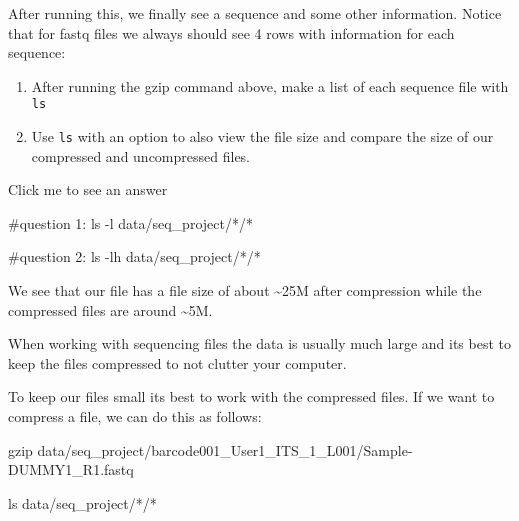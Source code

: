 \documentclass[
  letterpaper,
  DIV=11,
  numbers=noendperiod]{scrreprt}
\newenvironment{Shaded}{}{}
\newcommand{\AttributeTok}[1]{\textcolor[rgb]{0.84,0.23,0.29}{#1}}
\newcommand{\CommentTok}[1]{\textcolor[rgb]{0.42,0.45,0.49}{#1}}
\newcommand{\FunctionTok}[1]{\textcolor[rgb]{0.44,0.26,0.76}{#1}}
\newcommand{\NormalTok}[1]{\textcolor[rgb]{0.14,0.16,0.18}{#1}}
\newcommand{\PreprocessorTok}[1]{\textcolor[rgb]{0.84,0.23,0.29}{#1}}
\providecommand{\tightlist}{%
  \setlength{\itemsep}{0pt}\setlength{\parskip}{0pt}}\usepackage{longtable,booktabs,array}
\begin{document}
After running this, we finally see a sequence and some other
information. Notice that for fastq files we always should see 4 rows
with information for each sequence:

\begin{tcolorbox}[enhanced jigsaw, bottomtitle=1mm, colframe=quarto-callout-caution-color-frame, left=2mm, leftrule=.75mm, coltitle=black, colbacktitle=quarto-callout-caution-color!10!white, toprule=.15mm, rightrule=.15mm, opacityback=0, titlerule=0mm, colback=white, breakable, bottomrule=.15mm, title=\textcolor{quarto-callout-caution-color}{\faFire}\hspace{0.5em}{Exercise}, arc=.35mm, toptitle=1mm, opacitybacktitle=0.6]

\begin{enumerate}
\def\labelenumi{\arabic{enumi}.}
\tightlist
\item
  After running the gzip command above, make a list of each sequence
  file with \texttt{ls}
\item
  Use \texttt{ls} with an option to also view the file size and compare
  the size of our compressed and uncompressed files.
\end{enumerate}

Click me to see an answer

\begin{Shaded}
\begin{Highlighting}[]
\CommentTok{\#question 1:}
\FunctionTok{ls} \AttributeTok{{-}l}\NormalTok{ data/seq\_project/}\PreprocessorTok{*}\NormalTok{/}\PreprocessorTok{*}

\CommentTok{\#question 2:}
\FunctionTok{ls} \AttributeTok{{-}lh}\NormalTok{ data/seq\_project/}\PreprocessorTok{*}\NormalTok{/}\PreprocessorTok{*}
\end{Highlighting}
\end{Shaded}

We see that our file has a file size of about \textasciitilde25M after
compression while the compressed files are around \textasciitilde5M.

When working with sequencing files the data is usually much large and
its best to keep the files compressed to not clutter your computer.

\end{tcolorbox}

To keep our files small its best to work with the compressed files. If
we want to compress a file, we can do this as follows:

\begin{Shaded}
\begin{Highlighting}[]
\FunctionTok{gzip}\NormalTok{ data/seq\_project/barcode001\_User1\_ITS\_1\_L001/Sample{-}DUMMY1\_R1.fastq}

\FunctionTok{ls}\NormalTok{ data/seq\_project/}\PreprocessorTok{*}\NormalTok{/}\PreprocessorTok{*}
\end{Highlighting}
\end{Shaded}
\end{document}
